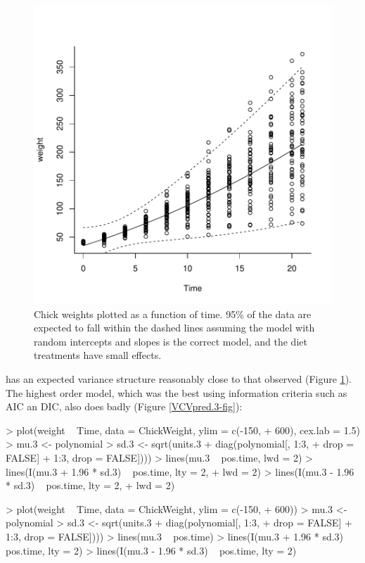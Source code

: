 \documentclass{article}
\begin{document}
\begin{figure}[!h]
\begin{center}
\includegraphics{Lecture4-037}
\end{center}
\caption{Chick weights plotted as a function of time. 95\% of the data are expected to fall within the dashed lines assuming the model with random intercepts and slopes is the correct model, and the diet treatments have small effects.}
\label{VCVpred.2-fig}
\end{figure}

has an expected variance structure reasonably close to that observed (Figure \ref{VCVpred.2-fig}). The highest order model, which was the best using information criteria such as AIC an DIC, also does badly (Figure \ref{VCVpred.3-fig}): 

\iftalk
\begin{Schunk}
\begin{Sinput}
> plot(weight ~ Time, data = ChickWeight, ylim = c(-150, 
+     600), cex.lab = 1.5)
> mu.3 <- polynomial %
> sd.3 <- sqrt(units.3 + diag(polynomial[, 1:3, 
+     drop = FALSE] %
+     1:3, drop = FALSE])))
> lines(mu.3 ~ pos.time, lwd = 2)
> lines(I(mu.3 + 1.96 * sd.3) ~ pos.time, lty = 2, 
+     lwd = 2)
> lines(I(mu.3 - 1.96 * sd.3) ~ pos.time, lty = 2, 
+     lwd = 2)
\end{Sinput}
\end{Schunk}
\else
\begin{Schunk}
\begin{Sinput}
> plot(weight ~ Time, data = ChickWeight, ylim = c(-150, 
+     600))
> mu.3 <- polynomial %
> sd.3 <- sqrt(units.3 + diag(polynomial[, 1:3, 
+     drop = FALSE] %
+     1:3, drop = FALSE])))
> lines(mu.3 ~ pos.time)
> lines(I(mu.3 + 1.96 * sd.3) ~ pos.time, lty = 2)
> lines(I(mu.3 - 1.96 * sd.3) ~ pos.time, lty = 2)
\end{Sinput}
\end{Schunk}
\fi
\end{document}
